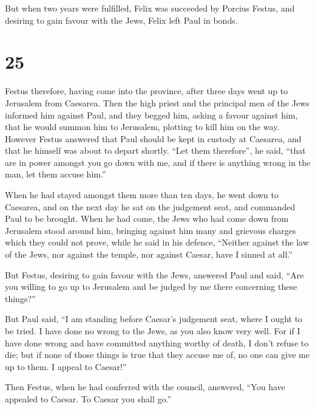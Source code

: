  But when two years were fulfilled, Felix was succeeded
by Porcius Festus, and desiring to gain favour with the Jews, Felix left
Paul in bonds.

\hypertarget{section-24}{%
\section{25}\label{section-24}}

 Festus therefore, having come into the province, after
three days went up to Jerusalem from Caesarea.  Then the
high priest and the principal men of the Jews informed him against Paul,
and they begged him,  asking a favour against him, that he
would summon him to Jerusalem, plotting to kill him on the way.
 However Festus answered that Paul should be kept in
custody at Caesarea, and that he himself was about to depart shortly.
 ``Let them therefore'', he said, ``that are in power
amongst you go down with me, and if there is anything wrong in the man,
let them accuse him.''

 When he had stayed amongst them more than ten days, he
went down to Caesarea, and on the next day he sat on the judgement seat,
and commanded Paul to be brought.  When he had come, the
Jews who had come down from Jerusalem stood around him, bringing against
him many and grievous charges which they could not prove, 
while he said in his defence, ``Neither against the law of the Jews, nor
against the temple, nor against Caesar, have I sinned at all.''

 But Festus, desiring to gain favour with the Jews,
answered Paul and said, ``Are you willing to go up to Jerusalem and be
judged by me there concerning these things?''

 But Paul said, ``I am standing before Caesar's judgement
seat, where I ought to be tried. I have done no wrong to the Jews, as
you also know very well.  For if I have done wrong and
have committed anything worthy of death, I don't refuse to die; but if
none of those things is true that they accuse me of, no one can give me
up to them. I appeal to Caesar!''

 Then Festus, when he had conferred with the council,
answered, ``You have appealed to Caesar. To Caesar you shall go.''

